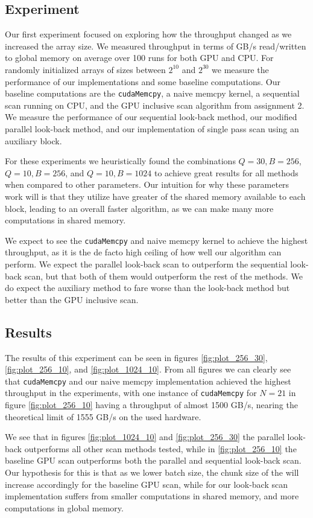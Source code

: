 \documentclass[twocolumn]{article}
\begin{document}
\subsection{Experiment}
Our first experiment focused on exploring how the throughput changed as we increased the array size. We measured throughput in terms of GB/s read/written to global memory on average over 100 runs for both GPU and CPU. For randomly initialized arrays of sizes between $2^{10}$ and $2^{30}$ we measure the performance of our implementations and some baseline computations. Our baseline computations are the \verb|cudaMemcpy|, a naive memcpy kernel, a sequential scan running on CPU, and the GPU inclusive scan algorithm from assignment 2. We measure the performance of our sequential look-back method, our modified parallel look-back method, and our implementation of single pass scan using an auxiliary block.

For these experiments we heuristically found the combinations $Q=30,B=256$, $Q=10, B=256$, and $Q=10,B=1024$ to achieve great results for all methods when compared to other parameters. Our intuition for why these parameters work will is that they utilize have greater of the shared memory available to each block, leading to an overall faster algorithm, as we can make many more computations in shared memory.

We expect to see the \verb|cudaMemcpy| and naive memcpy kernel to achieve the highest throughput, as it is the de facto high ceiling of how well our algorithm can perform. We expect the parallel look-back scan to outperform the sequential look-back scan, but that both of them would outperform the rest of the methods. We do expect the auxiliary method to fare worse than the look-back method but better than the GPU inclusive scan.

\subsection{Results}
The results of this experiment can be seen in figures \ref{fig:plot_256_30}, \ref{fig:plot_256_10}, and \ref{fig:plot_1024_10}. From all figures we can clearly see that \verb|cudaMemcpy| and our naive memcpy implementation achieved the highest throughput in the experiments, with one instance of \verb|cudaMemcpy| for $N=21$ in figure \ref{fig:plot_256_10} having a throughput of almost 1500 GB/s, nearing the theoretical limit of 1555 GB/s on the used hardware.

We see that in figures \ref{fig:plot_1024_10} and \ref{fig:plot_256_30} the parallel look-back outperforms all other scan methods tested, while in \ref{fig:plot_256_10} the baseline GPU scan outperforms both the parallel and sequential look-back scan. Our hypothesis for this is that as we lower batch size, the chunk size of the will increase accordingly for the baseline GPU scan, while for our look-back scan implementation suffers from smaller computations in shared memory, and more computations in global memory.
\end{document}
